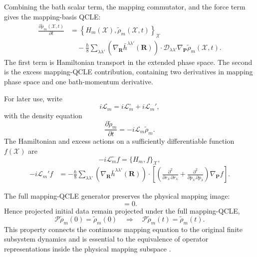 \documentclass[
  11pt,
  letterpaper,
  onehalfspacing,
  normalmargins,
  equalmargins,
  oneside
]{ut-thesis}
\begin{document}
Combining the bath scalar term, the mapping commutator, and the force term
gives the mapping-basis QCLE:
\begin{align}
\frac{\partial
\tilde\rho_m(\boldsymbol{\mathcal X},t)}{\partial t}
&=
\left\{
H_m(\boldsymbol{\mathcal X}),
\tilde\rho_m(\boldsymbol{\mathcal X},t)
\right\}_{\boldsymbol{\mathcal X}}
\nonumber\\
&\quad
-
\frac{\hbar}{8}
\sum_{\lambda\lambda'}
\left(
\nabla_{\mathbf R}\bar h^{\lambda\lambda'}(\mathbf R)
\right)
\cdot
\mathcal D_{\lambda\lambda'}
\nabla_{\mathbf P}
\tilde\rho_m(\boldsymbol{\mathcal X},t).
\label{eq:mapping-qcle-final}
\end{align}
The first term is Hamiltonian transport in the extended phase space. The
second is the excess mapping-QCLE contribution, containing two derivatives in
mapping phase space and one bath-momentum derivative.

For later use, write
\begin{equation}
i\mathcal L_m
=
i\mathcal L_m^{\circ}
+
i\mathcal L_m',
\label{eq:mapping-liouvillian-split}
\end{equation}
with the density equation
\begin{equation}
\frac{\partial\tilde\rho_m}{\partial t}
=
-i\mathcal L_m\tilde\rho_m.
\label{eq:mapping-qcle-liouville-form}
\end{equation}
The Hamiltonian and excess actions on a sufficiently differentiable function
\(f(\boldsymbol{\mathcal X})\) are
\begin{equation}
-i\mathcal L_m^{\circ}f
=
\{H_m,f\}_{\boldsymbol{\mathcal X}},
\label{eq:mapping-hamiltonian-liouvillian}
\end{equation}
\begin{align}
-i\mathcal L_m'f
&=
-
\frac{\hbar}{8}
\sum_{\lambda\lambda'}
\left(
\nabla_{\mathbf R}\bar h^{\lambda\lambda'}(\mathbf R)
\right)
\cdot
\left[
\left(
\frac{\partial^2}{\partial r_{\lambda'}\partial r_\lambda}
+
\frac{\partial^2}{\partial p_{\lambda'}\partial p_\lambda}
\right)
\nabla_{\mathbf P}f
\right].
\label{eq:mapping-excess-liouvillian}
\end{align}

The full mapping-QCLE generator preserves the physical mapping image:
\begin{equation}
[\mathcal P,i\mathcal L_m]=0.
\label{eq:mapping-qcle-projector-commutation}
\end{equation}
Hence projected initial data remain projected under the full mapping-QCLE,
\begin{equation}
\mathcal P\tilde\rho_m(0)=\tilde\rho_m(0)
\quad\Longrightarrow\quad
\mathcal P\tilde\rho_m(t)=\tilde\rho_m(t).
\label{eq:mapping-qcle-projection-preservation}
\end{equation}
This property connects the continuous mapping equation to the original finite
subsystem dynamics and is essential to the equivalence of operator
representations inside the physical mapping subspace
\cite{Kelly2012JCP}.
\end{document}

